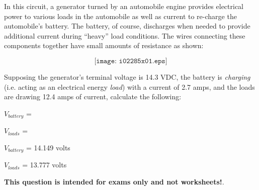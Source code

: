 

In this circuit, a generator turned by an automobile engine provides electrical power to various loads in the automobile as well as current to re-charge the automobile's battery.  The battery, of course, discharges when needed to provide additional current during ``heavy'' load conditions.  The wires connecting these components together have small amounts of resistance as shown:

$$\texttt{[image: i02285x01.eps]}$$

Supposing the generator's terminal voltage is 14.3 VDC, the battery is {\it charging} (i.e. acting as an electrical energy {\it load}) with a current of 2.7 amps, and the loads are drawing 12.4 amps of current, calculate the following:

\vskip 10pt

$V_{battery}$ = 

\vskip 10pt

$V_{loads}$ = 

\vskip 10pt







$V_{battery}$ = 14.149 volts

\vskip 10pt

$V_{loads}$ = 13.777 volts







{\bf This question is intended for exams only and not worksheets!}.



